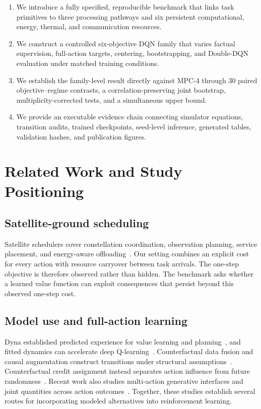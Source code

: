\documentclass[11pt]{article}
\begin{document}
\begin{enumerate}[leftmargin=1.6em]
    \item We introduce a fully specified, reproducible benchmark that links task primitives to three processing pathways and six persistent computational, energy, thermal, and communication resources.
    \item We construct a controlled six-objective DQN family that varies factual supervision, full-action targets, centering, bootstrapping, and Double-DQN evaluation under matched training conditions.
    \item We establish the family-level result directly against MPC-4 through 30 paired objective--regime contrasts, a correlation-preserving joint bootstrap, multiplicity-corrected tests, and a simultaneous upper bound.
    \item We provide an executable evidence chain connecting simulator equations, transition audits, trained checkpoints, seed-level inference, generated tables, validation hashes, and publication figures.
\end{enumerate}

\section{Related Work and Study Positioning}

\subsection{Satellite-ground scheduling}

Satellite schedulers cover constellation coordination, observation planning, service placement, and energy-aware offloading~\cite{RN8,RN10,RN20,RN22,RN23,RN27,RN28}. Our setting combines an explicit cost for every action with resource carryover between task arrivals. The one-step objective is therefore observed rather than hidden. The benchmark asks whether a learned value function can exploit consequences that persist beyond this observed one-step cost.

\subsection{Model use and full-action learning}

Dyna established predicted experience for value learning and planning~\cite{sutton1991dyna}, and fitted dynamics can accelerate deep Q-learning~\cite{gu2016continuous}. Counterfactual data fusion and causal augmentation construct transitions under structural assumptions~\cite{forney2017counterfactual,armengol2024caiac}. Counterfactual credit assignment instead separates action influence from future randomness~\cite{mesnard2021counterfactual}. Recent work also studies multi-action generative interfaces and joint quantities across action outcomes~\cite{kaya2026joint}. Together, these studies establish several routes for incorporating modeled alternatives into reinforcement learning.
\end{document}
